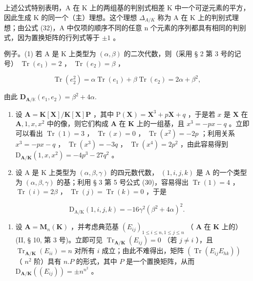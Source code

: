 上述公式特别表明，A 在 K 上的两组基的判别式相差 K 中一个可逆元素的平方，因此生成 K 的同一个（主）理想。这个理想 \(\Delta_{A/K}\) 称为 A 在 K 上的判别式理想；由公式 (32)，A 中仅项的顺序不同的任意 n 个元素的序列都具有相同的判别式，因为置换矩阵的行列式等于 \(\pm1\) 。

例子。(1) 若 A 是 K 上类型为 \((\alpha, \beta)\) 的二次代数，则（采用 § 2 第 3 号的记号） \(\operatorname{Tr}(e_1) = 2\) ， \(\operatorname{Tr}(e_2) = \beta\) ，

\[
\operatorname{Tr} (e _ {2} ^ {2}) = \alpha \operatorname{Tr} (e _ {1}) + \beta \operatorname{Tr} (e _ {2}) = 2 \alpha + \beta^ {2},
\]

由此 \(\mathbf{D}_{\mathbf{A} / \mathbb{K}}(e_1,e_2) = \beta^2 +4\alpha .\)

\begin{enumerate}
\def\labelenumi{(\arabic{enumi})}
\setcounter{enumi}{1}
\item
  设 \(\mathbf{A} = \mathbf{K}[\mathbf{X}] / \mathbf{K}[\mathbf{X}]\mathbf{P}\) ，其中 \(\mathrm{P}(\mathbf{X}) = \mathbf{X}^3 + p\mathbf{X} + q\) ，于是若 \(x\) 是 \(\mathbf{X}\) 在 \(\mathbf{A}, 1, x, x^2\) 中的像，则它们构成 \(\mathbf{A}\) 在 \(\mathbf{K}\) 上的一组基，且 \(x^3 = -px - q\) 。立即可以看出 \(\operatorname{Tr}(1) = 3\) ， \(\operatorname{Tr}(x) = 0\) ， \(\operatorname{Tr}(x^2) = -2p\) ；利用关系 \(x^3 = -px - q\) ， \(\operatorname{Tr}(x^3) = -3q\) ， \(\operatorname{Tr}(x^4) = 2p^2\) ，由此容易得到 \(\mathrm{D}_{\mathbf{A} / \mathbf{K}}(1, x, x^2) = -4p^3 - 27q^2\) 。
\item
  设 A 是 K 上类型为 \((\alpha, \beta, \gamma)\) 的四元数代数， \((1, i, j, k)\) 是 A 的一个类型为 \((\alpha, \beta, \gamma)\) 的基；利用 § 3 第 5 号公式 (30)，容易得出 \(\operatorname{Tr}(1) = 4\) ， \(\operatorname{Tr}(i) = 2\beta\) ， \(\operatorname{Tr}(j) = \operatorname{Tr}(k) = 0\) ，于是
\end{enumerate}

\[
\mathrm{D} _ {\mathrm{A/K}} (1, i, j, k) = - 16 \gamma^ {2} (\beta^ {2} + 4 \alpha) ^ {2}.
\]

\begin{enumerate}
\def\labelenumi{(\arabic{enumi})}
\setcounter{enumi}{3}
\tightlist
\item
  设 \(\mathbf{A} = \mathbf{M}_n(\mathbf{K})\) ，并考虑典范基 \((E_{ij})_{1\leqslant i\leqslant n,1\leqslant j\leqslant n}\) （ \(\mathbf{A}\) 在 \(\mathbf{K}\) 上的）(II, § 10, 第 3 号)。立即可见 \(\operatorname{Tr}_{\mathbf{A} / \mathbf{K}}(E_{ij}) = 0\) （若 \(j\neq i\) ），且 \(\operatorname{Tr}_{\mathbf{A} / \mathbf{K}}(E_{ii}) = n\) 对所有 \(i\) 成立；由此不难得出，矩阵 \((\operatorname{Tr}(E_{ij}E_{hk}))\) （ \(n^2\) 阶）具有 \(n.P\) 的形式，其中 \(P\) 是一个置换矩阵，从而 \(\mathrm{D}_{\mathbf{A} / \mathbf{K}}((E_{ij})) = \pm n^{n^2}\) 。
\end{enumerate}

